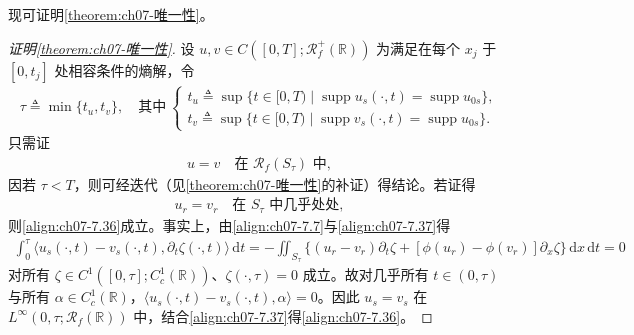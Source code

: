 \documentclass[../../main.tex]{subfiles}%
\begin{document}
现可证明\cref{theorem:ch07-唯一性}。

\begin{proof}[证明\cref{theorem:ch07-唯一性}]
设 $u,v\in C([0,T];\mathscr{R}_f^+(\mathbb{R}))$ 为满足在每个 $x_j$ 于 $[0,t_j]$ 处相容条件的熵解，令
\begin{align}
\tau\triangleq\min\{t_u,t_v\},\quad\text{其中}\
\begin{cases}
t_u\triangleq\sup\{t\in[0,T)\mid\operatorname{supp}u_s(\cdot,t)=\operatorname{supp}u_{0s}\},\\
t_v\triangleq\sup\{t\in[0,T)\mid\operatorname{supp}v_s(\cdot,t)=\operatorname{supp}u_{0s}\}.
\end{cases} 
\label{align:ch07-7.35}
\end{align}
只需证
\begin{align}
u=v\quad\text{在 }\mathscr{R}_f(S_\tau)\text{ 中}, \label{align:ch07-7.36}
\end{align}
因若 $\tau<T$，则可经迭代（见\cref{theorem:ch07-唯一性}的补证）得结论。若证得
\begin{align}
u_r=v_r\quad\text{在 }S_\tau\text{ 中几乎处处}, \label{align:ch07-7.37}
\end{align}
则\eqref{align:ch07-7.36}成立。事实上，由\eqref{align:ch07-7.7}与\eqref{align:ch07-7.37}得
\begin{align*}
\int_0^\tau\langle u_s(\cdot,t)-v_s(\cdot,t),\partial_t\zeta(\cdot,t)\rangle\,\mathrm{d}t
=-\iint_{S_\tau}\{(u_r-v_r)\partial_t\zeta+[\phi(u_r)-\phi(v_r)]\partial_x\zeta\}\,\mathrm{d}x\,\mathrm{d}t=0
\end{align*}
对所有 $\zeta\in C^1([0,\tau];C^1_c(\mathbb{R}))$、$\zeta(\cdot,\tau)=0$ 成立。故对几乎所有 $t\in(0,\tau)$ 与所有 $\alpha\in C^1_c(\mathbb{R})$，$\langle u_s(\cdot,t)-v_s(\cdot,t),\alpha\rangle=0$。因此 $u_s=v_s$ 在 $L^\infty(0,\tau;\mathscr{R}_f(\mathbb{R}))$ 中，结合\eqref{align:ch07-7.37}得\eqref{align:ch07-7.36}。


\end{proof}
\end{document}
